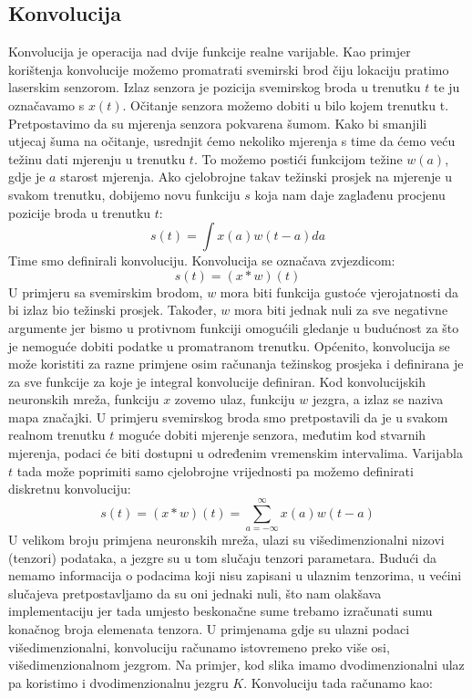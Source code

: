 \subsection{Konvolucija}
Konvolucija je operacija nad dvije funkcije realne varijable. Kao primjer korištenja konvolucije možemo promatrati svemirski brod čiju lokaciju pratimo laserskim senzorom. Izlaz senzora je pozicija svemirskog broda u trenutku $t$ te ju označavamo s $x(t)$. Očitanje senzora možemo dobiti u bilo kojem trenutku t.
Pretpostavimo da su mjerenja senzora pokvarena šumom. Kako bi smanjili utjecaj šuma na očitanje, usrednjit ćemo nekoliko mjerenja s time da ćemo veću težinu dati mjerenju u trenutku $t$. To možemo postići funkcijom težine $w(a)$, gdje je $a$ starost mjerenja. Ako cjelobrojne takav težinski prosjek na mjerenje u svakom trenutku, dobijemo novu funkciju $s$ koja nam daje zaglađenu procjenu pozicije broda u trenutku $t$:
\[
s(t) = \int x(a)w(t-a)da
\]
Time smo definirali konvoluciju. Konvolucija se označava zvjezdicom:
\[
s(t) = (x \ast w)(t)
\]
U primjeru sa svemirskim brodom, $w$ mora biti funkcija gustoće vjerojatnosti da bi izlaz bio težinski prosjek. Također, $w$ mora biti jednak nuli za sve negativne argumente jer bismo u protivnom funkciji omogućili gledanje u budućnost za što je nemoguće dobiti podatke u promatranom trenutku. Općenito, konvolucija se može koristiti za razne primjene osim računanja težinskog prosjeka i definirana je za sve funkcije za koje je integral konvolucije definiran.
Kod konvolucijskih neuronskih mreža, funkciju $x$ zovemo ulaz, funkciju $w$ jezgra, a izlaz se naziva mapa značajki.
U primjeru svemirskog broda smo pretpostavili da je u svakom realnom trenutku $t$ moguće dobiti mjerenje senzora, međutim kod stvarnih mjerenja, podaci će biti dostupni u određenim vremenskim intervalima. Varijabla $t$ tada može poprimiti samo cjelobrojne vrijednosti pa možemo definirati diskretnu konvoluciju:
\[
s(t) = (x \ast w)(t) = \sum\limits_{a = - \infty}^{\infty} x(a)w(t-a) 
\] 
U velikom broju primjena neuronskih mreža, ulazi su višedimenzionalni nizovi (tenzori) podataka, a jezgre su u tom slučaju tenzori parametara. Budući da nemamo informacija o podacima koji nisu zapisani u ulaznim tenzorima, u većini slučajeva pretpostavljamo da su oni jednaki nuli, što nam olakšava implementaciju jer tada umjesto beskonačne sume trebamo izračunati sumu konačnog broja elemenata tenzora. U primjenama gdje su ulazni podaci višedimenzionalni, konvoluciju računamo istovremeno preko više osi, višedimenzionalnom jezgrom. Na primjer, kod slika imamo dvodimenzionalni ulaz pa koristimo i dvodimenzionalnu jezgru $K$. Konvoluciju tada računamo kao:
